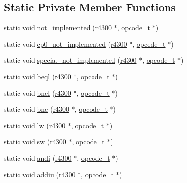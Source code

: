 \subsection*{Static Private Member Functions}
\begin{DoxyCompactItemize}
\item 
static void \hyperlink{classultra64_1_1r4300_a76d6699da1398760e461f85be19e134d}{not\+\_\+implemented} (\hyperlink{classultra64_1_1r4300}{r4300} $\ast$, \hyperlink{classultra64_1_1opcode__t}{opcode\+\_\+t} $\ast$)
\item 
static void \hyperlink{classultra64_1_1r4300_a703fdd21f221dbc7524a444380dc6103}{cp0\+\_\+not\+\_\+implemented} (\hyperlink{classultra64_1_1r4300}{r4300} $\ast$, \hyperlink{classultra64_1_1opcode__t}{opcode\+\_\+t} $\ast$)
\item 
static void \hyperlink{classultra64_1_1r4300_aa897d0fe9ea4fa3da5ad238fc53c1437}{special\+\_\+not\+\_\+implemented} (\hyperlink{classultra64_1_1r4300}{r4300} $\ast$, \hyperlink{classultra64_1_1opcode__t}{opcode\+\_\+t} $\ast$)
\item 
static void \hyperlink{classultra64_1_1r4300_a4cac0b74f108aba37a9d490ea108e462}{beql} (\hyperlink{classultra64_1_1r4300}{r4300} $\ast$, \hyperlink{classultra64_1_1opcode__t}{opcode\+\_\+t} $\ast$)
\item 
static void \hyperlink{classultra64_1_1r4300_acfe0ea0b8feeaa51e31cb666f204646b}{bnel} (\hyperlink{classultra64_1_1r4300}{r4300} $\ast$, \hyperlink{classultra64_1_1opcode__t}{opcode\+\_\+t} $\ast$)
\item 
static void \hyperlink{classultra64_1_1r4300_a42488331ec6ffe52b90a8b3c799a3e7a}{bne} (\hyperlink{classultra64_1_1r4300}{r4300} $\ast$, \hyperlink{classultra64_1_1opcode__t}{opcode\+\_\+t} $\ast$)
\item 
static void \hyperlink{classultra64_1_1r4300_ab086cc9e855063b56cd32b7e373aacb4}{lw} (\hyperlink{classultra64_1_1r4300}{r4300} $\ast$, \hyperlink{classultra64_1_1opcode__t}{opcode\+\_\+t} $\ast$)
\item 
static void \hyperlink{classultra64_1_1r4300_a51cedfe94a9ca0f2002a6acec4e72591}{sw} (\hyperlink{classultra64_1_1r4300}{r4300} $\ast$, \hyperlink{classultra64_1_1opcode__t}{opcode\+\_\+t} $\ast$)
\item 
static void \hyperlink{classultra64_1_1r4300_aafd958f51c826972123b0f8ee9b3304f}{andi} (\hyperlink{classultra64_1_1r4300}{r4300} $\ast$, \hyperlink{classultra64_1_1opcode__t}{opcode\+\_\+t} $\ast$)
\item 
static void \hyperlink{classultra64_1_1r4300_a2818243049b2f4c70c8b5800a908c51b}{addiu} (\hyperlink{classultra64_1_1r4300}{r4300} $\ast$, \hyperlink{classultra64_1_1opcode__t}{opcode\+\_\+t} $\ast$)

\end{DoxyCompactItemize}
